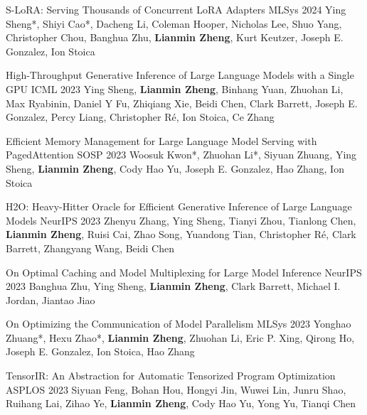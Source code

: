 
\begin{cventries}
	
	\cventry
	{}
	{S-LoRA: Serving Thousands of Concurrent LoRA Adapters} %
	{MLSys 2024} %
	{} %
	{Ying Sheng*, Shiyi Cao*, Dacheng Li, Coleman Hooper, Nicholas Lee, Shuo Yang, Christopher Chou, Banghua Zhu, \textbf{Lianmin Zheng}, Kurt Keutzer, Joseph E. Gonzalez, Ion Stoica}

	\cventry
	{}
	{High-Throughput Generative Inference of Large Language Models with a Single GPU} %
	{ICML 2023} %
	{} %
	{Ying Sheng, \textbf{Lianmin Zheng}, Binhang Yuan, Zhuohan Li, Max Ryabinin, Daniel Y Fu, Zhiqiang Xie, Beidi Chen, Clark Barrett, Joseph E. Gonzalez, Percy Liang, Christopher Ré, Ion Stoica, Ce Zhang}

	\cventry
	{}
	{Efficient Memory Management for Large Language Model Serving with PagedAttention} %
	{SOSP 2023} %
	{} %
	{Woosuk Kwon*, Zhuohan Li*, Siyuan Zhuang, Ying Sheng, \textbf{Lianmin Zheng}, Cody Hao Yu, Joseph E. Gonzalez, Hao Zhang, Ion Stoica}
	
	\cventry
	{}
	{H2O: Heavy-Hitter Oracle for Efficient Generative Inference of Large Language Models} %
	{NeurIPS 2023} %
	{} %
	{Zhenyu Zhang, Ying Sheng, Tianyi Zhou, Tianlong Chen, \textbf{Lianmin Zheng}, Ruisi Cai, Zhao Song, Yuandong Tian, Christopher Ré, Clark Barrett, Zhangyang Wang, Beidi Chen}
	
	\cventry
	{}
	{On Optimal Caching and Model Multiplexing for Large Model Inference} %
	{NeurIPS 2023} %
	{} %
	{Banghua Zhu, Ying Sheng, \textbf{Lianmin Zheng}, Clark Barrett, Michael I. Jordan, Jiantao Jiao}
	
	\cventry
	{}
	{On Optimizing the Communication of Model Parallelism} %
	{MLSys 2023} %
	{} %
	{Yonghao Zhuang*, Hexu Zhao*, \textbf{Lianmin Zheng}, Zhuohan Li, Eric P. Xing, Qirong Ho, Joseph E. Gonzalez, Ion Stoica, Hao Zhang}
	
	\cventry
	{}
	{TensorIR: An Abstraction for Automatic Tensorized Program Optimization} %
	{ASPLOS 2023} %
	{} %
	{Siyuan Feng, Bohan Hou, Hongyi Jin, Wuwei Lin, Junru Shao, Ruihang Lai, Zihao Ye, \textbf{Lianmin Zheng}, Cody Hao Yu, Yong Yu, Tianqi Chen}
	

\end{cventries}
